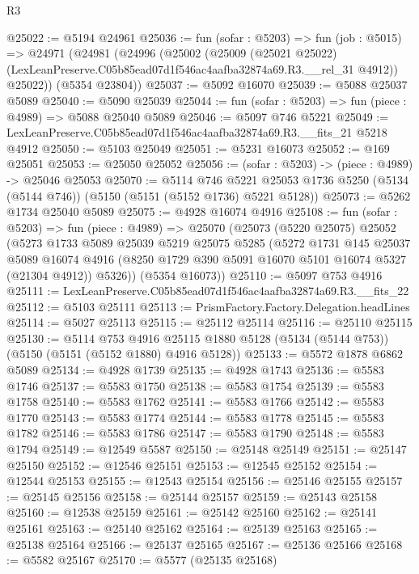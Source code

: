 \begin{lexlean}{R3}
\begin{coremodule}
@25022 := @5194 @24961
@25036 := fun (sofar : @5203) =>
  fun (job : @5015) =>
  @24971
    (@24981
      (@24996
        (@25002
          (@25009
            (@25021 @25022)
            (LexLeanPreserve.C05b85ead07d1f546ac4aafba32874a69.R3.__rel_31 @4912))
          @25022))
      (@5354 @23804))
@25037 := @5092 @16070
@25039 := @5088 @25037 @5089
@25040 := @5090 @25039
@25044 := fun (sofar : @5203) => fun (piece : @4989) => @5088 @25040 @5089
@25046 := @5097 @746 @5221
@25049 := LexLeanPreserve.C05b85ead07d1f546ac4aafba32874a69.R3.__fits_21 @5218 @4912
@25050 := @5103 @25049
@25051 := @5231 @16073
@25052 := @169 @25051
@25053 := @25050 @25052
@25056 := (sofar : @5203) -> (piece : @4989) -> @25046 @25053
@25070 := @5114
    @746
    @5221
    @25053
    @1736
    @5250
    (@5134 (@5144 @746))
    (@5150 (@5151 (@5152 @1736) @5221 @5128))
@25073 := @5262 @1734 @25040 @5089
@25075 := @4928 @16074 @4916
@25108 := fun (sofar : @5203) =>
  fun (piece : @4989) =>
  @25070
    (@25073
      (@5220 @25075)
      @25052
      (@5273
        @1733
        @5089
        @25039
        @5219
        @25075
        @5285
        (@5272
          @1731
          @145
          @25037
          @5089
          @16074
          @4916
          (@8250 @1729 @390 @5091 @16070 @5101 @16074 @5327 (@21304 @4912))
          @5326))
      (@5354 @16073))
@25110 := @5097 @753 @4916
@25111 := LexLeanPreserve.C05b85ead07d1f546ac4aafba32874a69.R3.__fits_22
@25112 := @5103 @25111
@25113 := PrismFactory.Factory.Delegation.headLines
@25114 := @5027 @25113
@25115 := @25112 @25114
@25116 := @25110 @25115
@25130 := @5114
    @753
    @4916
    @25115
    @1880
    @5128
    (@5134 (@5144 @753))
    (@5150 (@5151 (@5152 @1880) @4916 @5128))
@25133 := @5572 @1878 @6862 @5089
@25134 := @4928 @1739
@25135 := @4928 @1743
@25136 := @5583 @1746
@25137 := @5583 @1750
@25138 := @5583 @1754
@25139 := @5583 @1758
@25140 := @5583 @1762
@25141 := @5583 @1766
@25142 := @5583 @1770
@25143 := @5583 @1774
@25144 := @5583 @1778
@25145 := @5583 @1782
@25146 := @5583 @1786
@25147 := @5583 @1790
@25148 := @5583 @1794
@25149 := @12549 @5587
@25150 := @25148 @25149
@25151 := @25147 @25150
@25152 := @12546 @25151
@25153 := @12545 @25152
@25154 := @12544 @25153
@25155 := @12543 @25154
@25156 := @25146 @25155
@25157 := @25145 @25156
@25158 := @25144 @25157
@25159 := @25143 @25158
@25160 := @12538 @25159
@25161 := @25142 @25160
@25162 := @25141 @25161
@25163 := @25140 @25162
@25164 := @25139 @25163
@25165 := @25138 @25164
@25166 := @25137 @25165
@25167 := @25136 @25166
@25168 := @5582 @25167
@25170 := @5577 (@25135 @25168)

\end{coremodule}
\end{lexlean}
